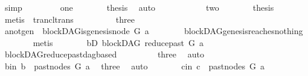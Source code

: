\begin{isabellebody}
\ simp\isanewline
\ \ \isamarkupfalse%
\isanewline
\ \ \ \ \isamarkupfalse%
\ one\isanewline
\ \ \ \ \isamarkupfalse%
\ \isamarkupfalse%
\ {\isacharquery}{\kern0pt}thesis\ \isamarkupfalse%
\ auto\ \ \ \isanewline
\ \ \isamarkupfalse%
\isanewline
\ \ \ \ \isamarkupfalse%
\ two\isanewline
\ \ \ \ \isamarkupfalse%
\ \isamarkupfalse%
\ {\isacharquery}{\kern0pt}thesis\isanewline
\ \ \ \ \ \ \isamarkupfalse%
\ {\isacharparenleft}{\kern0pt}metis\ {}{\isacharparenleft}{\kern0pt}{}{\isacharparenright}{\kern0pt}\ trancl{\isacharunderscore}{\kern0pt}trans{\isacharparenright}{\kern0pt}\ \isanewline
\ \ \isamarkupfalse%
\isanewline
\ \ \ \ \isamarkupfalse%
\ three\isanewline
\ \ \ \ \isamarkupfalse%
\ \isamarkupfalse%
\ a{\isacharunderscore}{\kern0pt}not{\isacharunderscore}{\kern0pt}gen{\isacharcolon}{\kern0pt}\ {\isachardoublequoteopen}{\isasymnot}\ blockDAG{\isachardot}{\kern0pt}is{\isacharunderscore}{\kern0pt}genesis{\isacharunderscore}{\kern0pt}node\ G\ a{\isachardoublequoteclose}\isanewline
\ \ \ \ \ \ \isamarkupfalse%
\ blockDAG{\isachardot}{\kern0pt}genesis{\isacharunderscore}{\kern0pt}reaches{\isacharunderscore}{\kern0pt}nothing\isanewline
\ \ \ \ \ \ \isamarkupfalse%
\ metis\isanewline
\ \ \ \ \isamarkupfalse%
\ \isamarkupfalse%
\ bD{\isacharcolon}{\kern0pt}\ {\isachardoublequoteopen}blockDAG\ {\isacharparenleft}{\kern0pt}reduce{\isacharunderscore}{\kern0pt}past\ G\ a{\isacharparenright}{\kern0pt}{\isachardoublequoteclose}\ \isamarkupfalse%
\ blockDAG{\isachardot}{\kern0pt}reduce{\isacharunderscore}{\kern0pt}past{\isacharunderscore}{\kern0pt}dagbased\ \isanewline
\ \ \ \ \ \ \ \ three\ \isamarkupfalse%
\ auto\isanewline
\ \ \ \ \isamarkupfalse%
\ b{\isacharunderscore}{\kern0pt}in{}{\isacharcolon}{\kern0pt}\ {\isachardoublequoteopen}b\ {\isasymin}\ past{\isacharunderscore}{\kern0pt}nodes\ G\ a{\isachardoublequoteclose}\ \isamarkupfalse%
\ three\ \isamarkupfalse%
\ auto\isanewline
\ \ \ \ \isamarkupfalse%
\ \isamarkupfalse%
\ c{\isacharunderscore}{\kern0pt}in{}{\isacharcolon}{\kern0pt}\ {\isachardoublequoteopen}c\ {\isasymin}\ past{\isacharunderscore}{\kern0pt}nodes\ G\ a{\isachardoublequoteclose}\ \isamarkupfalse%

\end{isabellebody}
